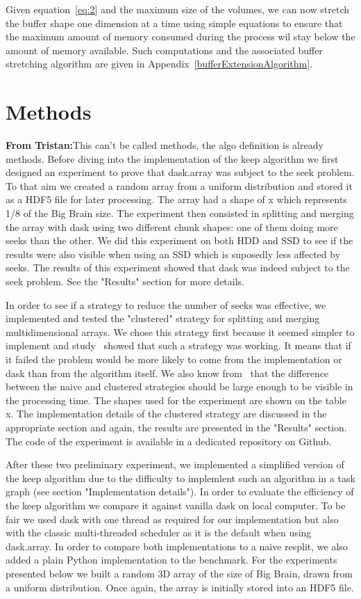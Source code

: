 \documentclass[conference]{IEEEtran}
\newcommand{\tristan}[1]{\color{orange}\textbf{From Tristan:}#1\color{black}}
\begin{document}
Given equation~\ref{eq:2} and the maximum size of the volumes, we can now
stretch the buffer shape one dimension at a time using simple equations to ensure
that the maximum amount of memory consumed during the process wil stay below the
amount of memory available. Such computations and the associated buffer stretching
algorithm are given in Appendix~\ref{bufferExtensionAlgorithm}.

\section{Methods}
\tristan{This can't be called methods, the algo definition is already methods.}
Before diving into the implementation of the keep algorithm we first designed
an experiment to prove that dask.array was subject to the seek problem. To that
aim we created a random array from a uniform distribution and stored it as a
HDF5 file for later processing. The array had a shape of x which represents 1/8
of the Big Brain size. The experiment then consisted in splitting and merging
the array with dask using two different chunk shapes: one of them doing more
seeks than the other. We did this experiment on both HDD and SSD to see if the
results were also visible when using an SSD which is suposedly less affected by
seeks. The results of this experiment showed that dask was indeed subject to the
seek problem. See the "Results" section for more details.

In order to see if a strategy to reduce the number of seeks was effective, we
implemented and tested the "clustered" strategy for splitting and merging
multidimensional arrays. We chose this strategy first because it seemed simpler
to implement and study~\cite{seqalgorithms} showed that such a strategy was
working. It means that if it failed the problem would be more likely to come
from the implementation or dask than from the algorithm itself. We also know
from~\cite{seqalgorithms} that the difference between the naive and clustered
strategies should be large enough to be visible in the processing time. The
shapes used for the experiment are shown on the table x. The implementation
details of the clustered strategy are discussed in the appropriate section and
again, the results are presented in the "Results" section. The code of the
experiment is available in a dedicated repository on Github.

After these two preliminary experiment, we implemented a simplified version of
the keep algorithm due to the difficulty to implemlent such an algorithm in a
task graph (see section "Implementation details"). In order to evaluate the
efficiency of the keep algorithm we compare it against vanilla dask on local
computer. To be fair we used dask with one thread as required for our
implementation but also with the classic multi-threaded  scheduler as it is the
default when using dask.array. In order to compare both implementations to a
naive resplit, we also added a plain Python implementation to the benchmark. For
the experiments presented below we built a random 3D array of the size of Big
Brain, drawn from a uniform distribution. Once again, the array is initially
stored into an HDF5 file.
\end{document}
